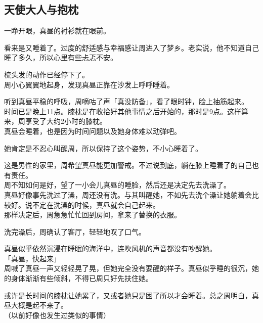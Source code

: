 \subsection{天使大人与抱枕}

一睁开眼，真昼的衬衫就在眼前。

看来是又睡着了。过度的舒适感与幸福感让周进入了梦乡。老实说，他不知道自己睡了多久，所以心里有些忐忑不安。

梳头发的动作已经停下了。\\

周小心翼翼地起身，发现真昼正靠在沙发上呼呼睡着。

听到真昼平稳的呼吸，周嘀咕了声「真没防备」，看了眼时钟，脸上抽筋起来。\\

时间已是晚上11点。膝枕是在收拾好其他事情之后开始的，那时是9点。这样算来，周享受了大约2小时的膝枕。\\

真昼会睡着，也是因为时间问题以及她身体难以动弹吧。

她肯定是不忍心叫醒周，所以保持了这个姿势，不小心睡着了。

这是男性的家里，周希望真昼能更加警戒。不过说到底，躺在膝上睡着了的自己也有责任。\\

周不知如何是好，望了一小会儿真昼的睡脸，然后还是决定先去洗澡了。\\

真昼好像事先洗过了澡，周还没有洗。与其叫醒她，不如先去洗个澡让她躺着会比较好。说不定在洗澡的时候，真昼就会自己起来。\\

那样决定后，周急急忙忙回到房间，拿来了替换的衣服。\\

\vspace{2\baselineskip}

洗完澡后，周确认了客厅，轻轻地叹了口气。

真昼似乎依然沉浸在睡眠的海洋中，连吹风机的声音都没有吵醒她。\\

「真昼，快起来」\\

周喊了真昼一声又轻轻晃了晃，但她完全没有要醒的样子。真昼似乎睡的很沉，她的身体渐渐有些倾斜，不得已周只好先扶住她。

或许是长时间的膝枕让她累了，又或者她只是困了所以才会睡着。总之周明白，真昼大概是起不来了。\\

（以前好像也发生过类似的事情）\\

